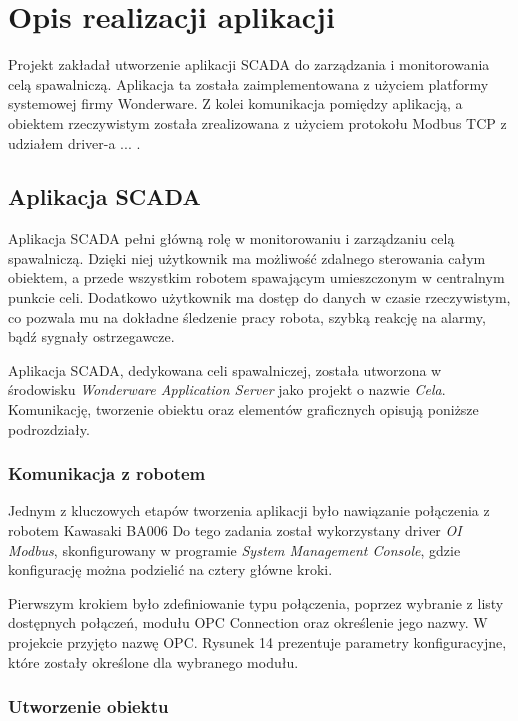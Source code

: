 \chapter{Opis realizacji aplikacji}

Projekt zakładał utworzenie aplikacji SCADA do zarządzania i monitorowania celą spawalniczą. Aplikacja ta została zaimplementowana z użyciem platformy systemowej firmy Wonderware. Z kolei komunikacja pomiędzy aplikacją, a obiektem rzeczywistym została zrealizowana z użyciem protokołu Modbus TCP z udziałem driver-a ... . 


\section{Aplikacja SCADA}

Aplikacja SCADA pełni główną rolę w monitorowaniu i zarządzaniu celą spawalniczą.  Dzięki niej użytkownik ma możliwość zdalnego sterowania całym obiektem, a przede wszystkim robotem spawającym umieszczonym w centralnym punkcie celi. Dodatkowo użytkownik ma dostęp do danych w czasie rzeczywistym, co pozwala mu na dokładne śledzenie pracy robota, szybką reakcję na alarmy, bądź sygnały ostrzegawcze. 

Aplikacja SCADA, dedykowana celi spawalniczej, została utworzona w środowisku \textit{Wonderware Application Server} jako projekt o nazwie \textit{Cela}. Komunikację, tworzenie obiektu oraz elementów graficznych opisują poniższe podrozdziały.


\subsection{Komunikacja z robotem}

Jednym z kluczowych etapów tworzenia aplikacji było nawiązanie połączenia z robotem Kawasaki BA006%
Do tego zadania został wykorzystany driver \textit{OI Modbus}, skonfigurowany w programie \textit{System Management Console}, gdzie konfigurację można podzielić na cztery główne kroki.

Pierwszym krokiem było zdefiniowanie typu połączenia, poprzez wybranie z listy dostępnych połączeń, modułu OPC Connection oraz określenie jego nazwy. W projekcie  przyjęto nazwę OPC. Rysunek 14 prezentuje parametry konfiguracyjne, które zostały określone dla wybranego modułu.


\subsection{Utworzenie obiektu}

